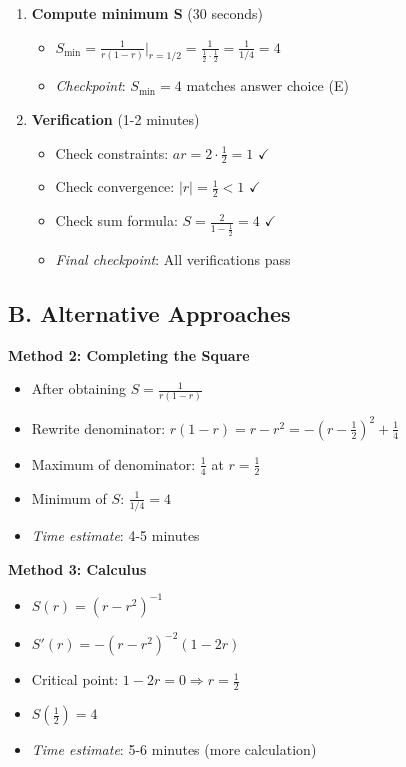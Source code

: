 \documentclass[12pt]{article}
\begin{document}
\begin{roadmapbox}
\begin{enumerate}[leftmargin=*]
    \item \textbf{Compute minimum S} (30 seconds)
    \begin{itemize}
        \item $S_{\min} = \frac{1}{r(1-r)}|_{r=1/2} = \frac{1}{\frac{1}{2} \cdot \frac{1}{2}} = \frac{1}{1/4} = 4$
        \item \textit{Checkpoint}: $S_{\min} = 4$ matches answer choice (E)
    \end{itemize}
    
    \item \textbf{Verification} (1-2 minutes)
    \begin{itemize}
        \item Check constraints: $ar = 2 \cdot \frac{1}{2} = 1$ $\checkmark$
        \item Check convergence: $|r| = \frac{1}{2} < 1$ $\checkmark$
        \item Check sum formula: $S = \frac{2}{1-\frac{1}{2}} = 4$ $\checkmark$
        \item \textit{Final checkpoint}: All verifications pass
    \end{itemize}
\end{enumerate}

\subsection*{B. Alternative Approaches}

\textbf{Method 2: Completing the Square}
\begin{itemize}[leftmargin=*]
    \item After obtaining $S = \frac{1}{r(1-r)}$
    \item Rewrite denominator: $r(1-r) = r - r^2 = -\left(r - \frac{1}{2}\right)^2 + \frac{1}{4}$
    \item Maximum of denominator: $\frac{1}{4}$ at $r = \frac{1}{2}$
    \item Minimum of $S$: $\frac{1}{1/4} = 4$
    \item \textit{Time estimate}: 4-5 minutes
\end{itemize}

\textbf{Method 3: Calculus}
\begin{itemize}[leftmargin=*]
    \item $S(r) = (r-r^2)^{-1}$
    \item $S'(r) = -(r-r^2)^{-2}(1-2r)$
    \item Critical point: $1-2r = 0 \Rightarrow r = \frac{1}{2}$
    \item $S(\frac{1}{2}) = 4$
    \item \textit{Time estimate}: 5-6 minutes (more calculation)
\end{itemize}


\end{roadmapbox}
\end{document}
